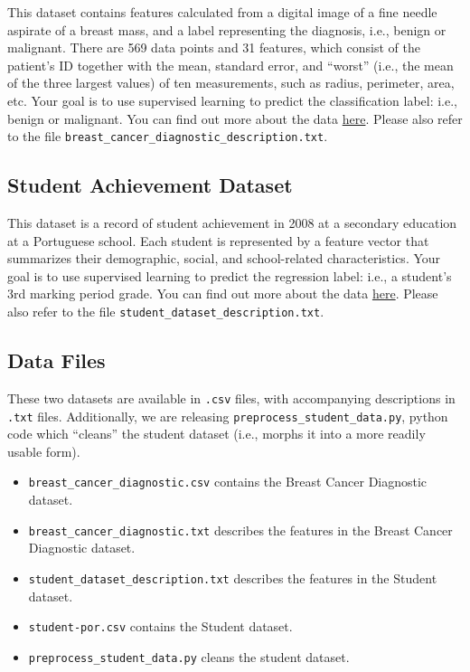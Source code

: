 \documentclass{article}
\begin{document}
This dataset contains features calculated from a digital image of a fine needle aspirate of a breast mass,
and a label representing the diagnosis, i.e., benign or malignant.
There are 569 data points and 31 features, which consist of the patient's ID
together with the mean, standard error, and  ``worst'' (i.e., the mean of the three largest values)
of ten measurements, such as radius, perimeter, area, etc.
%
Your goal is to use supervised learning to predict the classification label: i.e., benign or malignant.
You can find out more about the data
\href{http://archive.ics.uci.edu/ml/datasets/Breast+Cancer+Wisconsin+(Diagnostic)}{here}.
Please also refer to the file
\verb|breast_cancer_diagnostic_description.txt|.

\subsection{Student Achievement Dataset}

This dataset is a record of student achievement in 2008 at a secondary education at a Portuguese school.
Each student is represented by a feature vector that summarizes their demographic, social, and school-related characteristics.
%
Your goal is to use supervised learning to predict the regression label: i.e., a student's 3rd marking period grade.
You can find out more about the data
\href{http://archive.ics.uci.edu/ml/datasets/Student+Performance}{here}.
Please also refer to the file \verb|student_dataset_description.txt|.

\subsection{Data Files}

These two datasets are available in \texttt{.csv} files, with accompanying descriptions in \texttt{.txt} files.
Additionally, we are releasing \verb|preprocess_student_data.py|, python code which ``cleans'' the student dataset
(i.e., morphs it into a more readily usable form).
  
\begin{itemize}
\item \verb|breast_cancer_diagnostic.csv| contains the Breast Cancer Diagnostic dataset.
\item \verb|breast_cancer_diagnostic.txt| describes the features in the Breast Cancer Diagnostic dataset.

\item \verb|student_dataset_description.txt| describes the features in the Student dataset.
\item \verb|student-por.csv| contains the Student dataset.
\item \verb|preprocess_student_data.py| cleans the student dataset.
\end{itemize}
\fi
\end{document}
